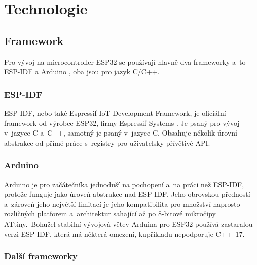 \chapter{Technologie}

\section{Framework}

Pro vývoj na microcontroller ESP32 se používají hlavně dva frameworky a~to ESP-IDF \cite{ESP-IDF} a Arduino \cite{arduino}, oba jsou pro jazyk C/C++.

\subsection{ESP-IDF}

ESP-IDF, nebo také Espressif IoT Development Framework, je oficiální framework od výrobce ESP32, firmy Espressif Systems \cite{espressif}.
Je psaný pro vývoj v~jazyce C a~C++, samotný je psaný v~jazyce C.
Obsahuje několik úrovní abstrakce od přímé práce s~registry pro uživatelsky přívětivé API.

\begin{minipage}{\linewidth}

\end{minipage}

\subsection{Arduino}

\enlargethispage{5mm}
Arduino je pro začátečníka jednoduší na pochopení a~na práci než ESP-IDF, protože funguje jako úroveň abstrakce nad ESP-IDF.
Jeho obrovskou předností a~zároveň jeho největší limitací je jeho kompatibilita pro množství naprosto rozličných platforem a~architektur sahající až po 8-bitové mikročipy ATtiny.~Bohužel stabilní vývojová větev Arduina pro ESP32 používá zastaralou verzi ESP-IDF, která má některá omezení, kupříkladu nepodporuje C++~17.

\begin{minipage}{\linewidth}
    
\end{minipage}

\subsection{Další frameworky}

